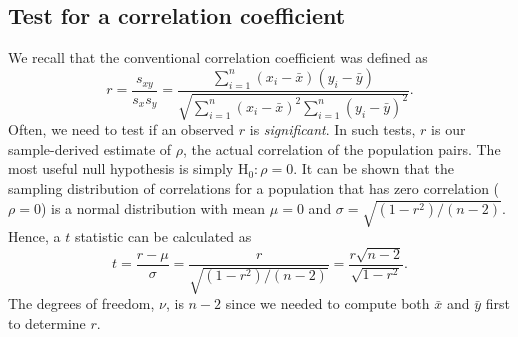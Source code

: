 \subsection{Test for a correlation coefficient}

We recall that the conventional correlation coefficient was defined as
\begin{equation}
r = \frac{s_{xy}}{s_x s_y} = 
\frac{\sum^n_{i=1} ( x_i - \bar{x}) (y_i - \bar{y})} {\sqrt { \sum^n_{i=1} (x_i - \bar{x})^2  \sum^n _{i=1} (y_i - \bar{y})^2}}.
\label{eq:corrcoef}
\end{equation}
Often, we need to test if an observed $r$ is \emph{significant}.  In such tests, $r$ is our sample-derived estimate of $\rho$, the 
actual correlation of the population pairs.  The most useful null hypothesis is simply H$_0: \rho = 0$.  It can be 
shown that the sampling distribution of correlations for a population that has zero correlation ($\rho = 0$) is a normal distribution 
with mean $\mu = 0$ and $\sigma = \sqrt{(1 - r^2)/(n-2)}$.  Hence, a $t$ statistic can be calculated as
\begin{equation}
t = \frac{r - \mu}{\sigma} = \frac{r}{\sqrt{(1-r^2)/(n-2)}} = \frac{r\sqrt{n-2}}{\sqrt{1-r^2}}.
\label{eq:t_stat_corr}
\end{equation}
The degrees of freedom, $\nu$, is $n - 2$ since we needed to compute both $\bar{x}$ and $\bar{y}$ first to determine $r$.
